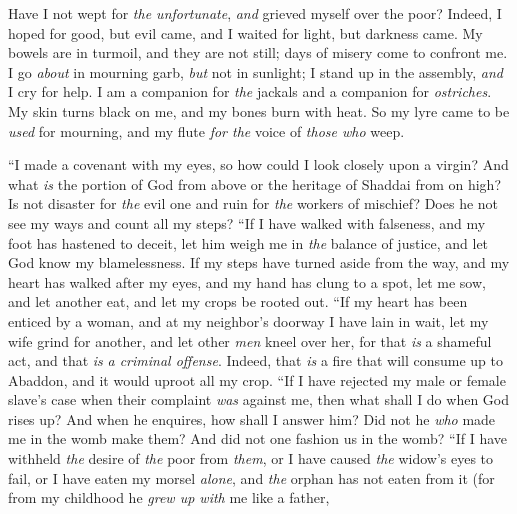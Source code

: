 \begin{biblechapter}
\verse Have I not wept for \textit{the unfortunate}, 
\textit{and} grieved myself over the poor?
\verse Indeed, I hoped for good, but evil came, 
and I waited for light, but darkness came.
\verse My bowels are in turmoil, and they are not still; 
days of misery come to confront me.
\verse I go \textit{about} in mourning garb, \textit{but} not in sunlight; 
I stand up in the assembly, \textit{and} I cry for help.
\verse I am a companion for \textit{the} jackals 
and a companion for \textit{ostriches}.
\verse My skin turns black on me, 
and my bones burn with heat.
\verse So my lyre came to be \textit{used} for mourning, 
and my flute \textit{for the} voice of \textit{those who} weep.
\end{biblechapter}

\begin{biblechapter} %
 “I made a covenant with my eyes, 
so how could I look closely upon a virgin?
\verse And what \textit{is} the portion of God from above 
or the heritage of Shaddai from on high?
\verse Is not disaster for \textit{the} evil one 
and ruin for \textit{the} workers of mischief?
\verse Does he not see my ways 
and count all my steps?
\verse “If I have walked with falseness, 
and my foot has hastened to deceit,
\verse let him weigh me in \textit{the} balance of justice, 
and let God know my blamelessness.
\verse If my steps have turned aside from the way, 
and my heart has walked after my eyes, 
and my hand has clung to a spot,
\verse let me sow, and let another eat, 
and let my crops be rooted out.
\verse “If my heart has been enticed by a woman, 
and at my neighbor’s doorway I have lain in wait,
\verse let my wife grind for another, 
and let other \textit{men} kneel over her,
\verse for that \textit{is} a shameful act, 
and that \textit{is} \textit{a criminal offense}.
\verse Indeed, that \textit{is} a fire that will consume up to Abaddon, 
and it would uproot all my crop.
\verse “If I have rejected my male or female slave’s case 
when their complaint \textit{was} against me,
\verse then what shall I do when God rises up? 
And when he enquires, how shall I answer him?
\verse Did not he \textit{who} made me in the womb make them? 
And did not one fashion us in the womb?
\verse “If I have withheld \textit{the} desire of \textit{the} poor from \textit{them}, 
or I have caused \textit{the} widow’s eyes to fail,
\verse or I have eaten my morsel \textit{alone}, 
and \textit{the} orphan has not eaten from it
\verse (for from my childhood he \textit{grew up with} me like a father, 

\end{biblechapter}
